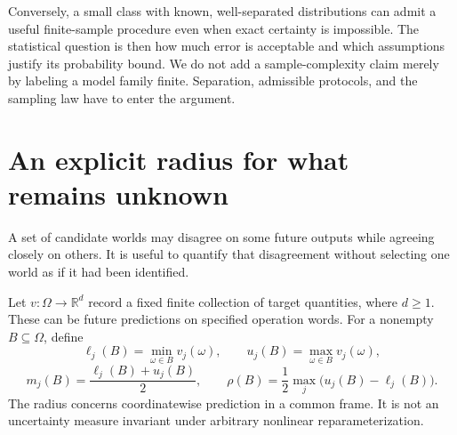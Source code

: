 \documentclass[11pt,letterpaper]{article}
\theoremstyle{plain}
\theoremstyle{definition}
\begin{document}
Conversely, a small class with known, well-separated distributions can admit a useful finite-sample procedure even when exact certainty is impossible. The statistical question is then how much error is acceptable and which assumptions justify its probability bound. We do not add a sample-complexity claim merely by labeling a model family finite. Separation, admissible protocols, and the sampling law have to enter the argument.

\section{An explicit radius for what remains unknown}\label{sec:radius}
A set of candidate worlds may disagree on some future outputs while agreeing closely on others. It is useful to quantify that disagreement without selecting one world as if it had been identified.

Let $v:\Omega\to\mathbb R^d$ record a fixed finite collection of target quantities, where $d\ge1$. These can be future predictions on specified operation words. For a nonempty $B\subseteq\Omega$, define
\[
\ell_j(B)=\min_{\omega\in B}v_j(\omega),\qquad
u_j(B)=\max_{\omega\in B}v_j(\omega),
\]
\[
m_j(B)=\frac{\ell_j(B)+u_j(B)}2,\qquad
\rho(B)=\frac12\max_j\bigl(u_j(B)-\ell_j(B)\bigr).\tag{5}
\]
The radius concerns coordinatewise prediction in a common frame. It is not an uncertainty measure invariant under arbitrary nonlinear reparameterization.
\end{document}
